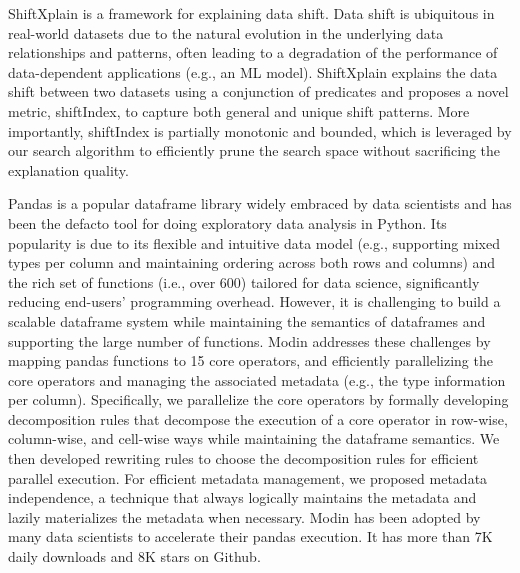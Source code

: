 \documentclass[10pt]{article} %
\begin{document}
{ShiftXplain is a framework for explaining data shift. 
Data shift is ubiquitous in real-world datasets 
due to the natural evolution in the underlying data 
relationships and patterns, often leading to a degradation 
of the performance of data-dependent applications (e.g., an ML model). 
ShiftXplain explains the data shift 
between two datasets using a conjunction of predicates 
and proposes a novel metric, shiftIndex, to capture 
both general and unique shift patterns. 
More importantly, shiftIndex is partially monotonic and bounded, 
which is leveraged by our search algorithm to efficiently 
prune the search space without sacrificing the explanation quality.}

\vspace{4mm}

{Pandas is a popular dataframe library widely embraced by data scientists and has been 
the defacto tool for doing exploratory data analysis in Python. 
Its popularity is due to its flexible and intuitive data model 
(e.g., supporting mixed types per column and maintaining 
ordering across both rows and columns) and the rich set of functions (i.e., over 600) 
tailored for data science, significantly reducing end-users' programming overhead. 
However, it is challenging to build a scalable dataframe system while maintaining the semantics of dataframes  
and supporting the large number of functions. Modin addresses these challenges by mapping pandas functions 
to 15 core operators, and efficiently parallelizing the core operators and managing the associated metadata 
(e.g., the type information per column). Specifically, we parallelize the core operators 
by formally developing decomposition rules that decompose the execution of a core operator 
in row-wise, column-wise, and cell-wise ways while maintaining the dataframe semantics. 
We then developed rewriting rules to choose the decomposition rules for efficient parallel execution. 
For efficient metadata management, we proposed metadata independence, 
a technique that always logically maintains the metadata and lazily materializes the metadata when necessary. 
Modin has been adopted by many data scientists to accelerate their pandas execution. 
It has more than 7K daily downloads and 8K stars on Github. }
\end{document}
